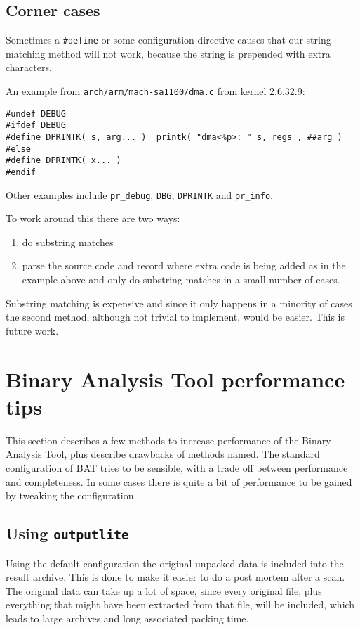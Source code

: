\documentclass[10pt]{article}
\begin{document}
\subsection{Corner cases}

Sometimes a \texttt{\#define} or some configuration directive causes that our 
string matching method will not work, because the string is prepended with
extra characters.

An example from \texttt{arch/arm/mach-sa1100/dma.c} from kernel 2.6.32.9:

\begin{verbatim}
#undef DEBUG
#ifdef DEBUG
#define DPRINTK( s, arg... )  printk( "dma<%p>: " s, regs , ##arg )
#else
#define DPRINTK( x... )
#endif
\end{verbatim}

Other examples include \texttt{pr\_debug}, \texttt{DBG}, \texttt{DPRINTK} and
\texttt{pr\_info}.

To work around this there are two ways:

\begin{enumerate}
\item do substring matches
\item parse the source code and record where extra code is being added as in
the example above and only do substring matches in a small number of cases.
\end{enumerate}

Substring matching is expensive and since it only happens in a minority of
cases the second method, although not trivial to implement, would be easier.
This is future work.

\section{Binary Analysis Tool performance tips}

This section describes a few methods to increase performance of the Binary
Analysis Tool, plus describe drawbacks of methods named. The standard
configuration of BAT tries to be sensible, with a trade off between performance
and completeness. In some cases there is quite a bit of performance to be
gained by tweaking the configuration.

\subsection{Using \texttt{outputlite}}

Using the default configuration the original unpacked data is included into
the result archive. This is done to make it easier to do a post mortem after a
scan. The original data can take up a lot of space, since every original file,
plus everything that might have been extracted from that file, will be
included, which leads to large archives and long associated packing time.
\end{document}
